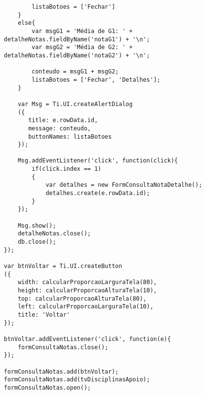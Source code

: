 \begin{lstlisting}
		listaBotoes = ['Fechar']
	}
	else{
		var msgG1 = 'Média de G1: ' + detalheNotas.fieldByName('notaG1') + '\n';
		var msgG2 = 'Média de G2: ' + detalheNotas.fieldByName('notaG2') + '\n';
		
		conteudo = msgG1 + msgG2;
		listaBotoes = ['Fechar', 'Detalhes'];
	}
	
 	var Msg = Ti.UI.createAlertDialog
	({
	   title: e.rowData.id,
	   message: conteudo,
	   buttonNames: listaBotoes
	});
	
	Msg.addEventListener('click', function(click){
		if(click.index == 1)
		{
			var detalhes = new FormConsultaNotaDetalhe();
			detalhes.create(e.rowData.id);
		}
	});
	
	Msg.show();
	detalheNotas.close();
	db.close();
});

var btnVoltar = Ti.UI.createButton
({
	width: calcularProporcaoLarguraTela(80),
	height: calcularProporcaoAlturaTela(10),
	top: calcularProporcaoAlturaTela(80),
    left: calcularProporcaoLarguraTela(10),
    title: 'Voltar'
});

btnVoltar.addEventListener('click', function(e){
	formConsultaNotas.close();
});
		
formConsultaNotas.add(btnVoltar);
formConsultaNotas.add(tvDisciplinasApoio);
formConsultaNotas.open();
\end{lstlisting}

